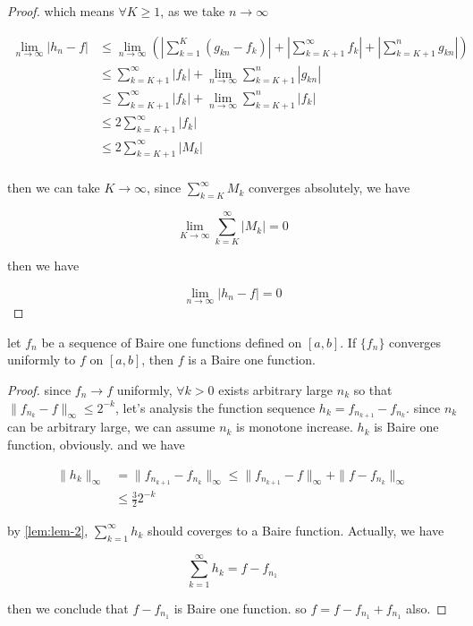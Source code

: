 \documentclass[11pt,a4paper]{article}
\begin{document}
\begin{proof}
    which means $\forall K \ge 1$, as we take $n \to \infty$

    \begin{align*}
        \lim_{n \to \infty}\lvert h_n - f \rvert &  \le \lim_{n \to \infty}\left( \left| \sum_{k=1}^{K}\left( g_{kn} - f_k\right)\right| + \left|\sum_{k=K+1}^{\infty}f_k\right| + \left|\sum_{k=K+1}^{n}g_{kn} \right| \right)\\
        & \le \sum_{k=K+1}^{\infty}\left|f_k\right| + \lim_{n \to \infty}\sum_{k=K+1}^{n}\left| g_{kn} \right|  \\
        & \le \sum_{k=K+1}^{\infty}\left|f_k\right| + \lim_{n \to \infty}\sum_{k=K+1}^{n}\left| f_{k} \right|  \\
        & \le  2\sum_{k=K+1}^{\infty}\left|f_k\right| \\
        & \le  2\sum_{k=K+1}^{\infty}\left|M_k\right| \\
    \end{align*}

    then we can take $K \to \infty$, since $\sum_{k=K}^{\infty} M_k$ converges absolutely, we have

    \[
        \lim_{K \to \infty}\sum_{k=K}^{\infty}\left|M_k\right| = 0
    \]

    then we have

    \[
        \lim_{n \to \infty}\lvert h_n - f \rvert = 0
    \]



   
\end{proof}

\begin{thm}
    let $f_n$ be a sequence of Baire one functions defined on $[a,b]$. If $\{ f_n \}$
    converges uniformly to $f$ on $[a,b]$, then $f$ is a Baire one function.

\end{thm}

\begin{proof}
    since $f_n \to f$ uniformly, $\forall k > 0$ exists arbitrary large $n_k$ so that $\| f_{n_k} - f\|_{\infty} \le 2^{-k}$, let's analysis the function sequence
$h_k = f_{n_{k+1}} - f_{n_k}$. since $n_k$ can be arbitrary large, we can assume $n_{k}$ is monotone increase. $h_k$ is Baire one function, obviously. and we have

\begin{align*}
    \| h_{k}  \|_{\infty} &= \| f_{n_{k+1}} -  f_{n_k} \|_{\infty} \le \| f_{n_{k+1}} -  f \|_{\infty} +  \|f - f_{n_k} \|_{\infty} \\
    & \le \frac{3}{2}2^{-k}
\end{align*}

by \autoref{lem:lem-2}, $\sum_{k=1}^{\infty} h_k$ should coverges to a Baire function. Actually, we have

\[
    \sum_{k=1}^{\infty}h_k = f - f_{n_1}
\]

then we conclude that $f - f_{n_1}$ is Baire one function. so $f = f -f_{n_1} + f_{n_1}$ also.
\end{proof}
\end{document}
